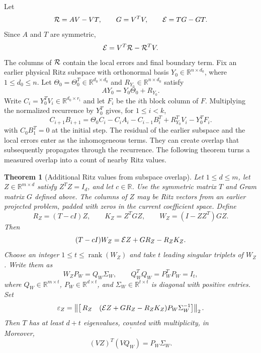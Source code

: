 \documentclass[11pt]{article}
\newtheorem{theorem}{Theorem}
\theoremstyle{definition}
\newcommand{\R}{\mathbb{R}}
\begin{document}
Let
\begin{equation}
 {\cal R}=AV-VT,
 \qquad G=V^TV,
 \qquad {\cal E}=TG-GT.
 \label{eq:ritz-gram-commutator}
\end{equation}
Since $A$ and $T$ are symmetric,
\begin{equation}
 {\cal E}=V^T{\cal R}-{\cal R}^TV.
 \label{eq:ritz-commutator-residual}
\end{equation}
The columns of ${\cal R}$ contain the local errors and final boundary term.
Fix an earlier physical Ritz subspace with orthonormal basis
$Y_0\in\R^{n\times d_0}$, where $1\le d_0\le n$.  Let
$\Theta_0=\Theta_0^T\in\R^{d_0\times d_0}$ and
$R_{Y_0}\in\R^{n\times d_0}$ satisfy
\[
 AY_0=Y_0\Theta_0+R_{Y_0}.
\]
Write $C_i=Y_0^TV_i\in\R^{d_0\times r_i}$ and let $F_i$ be the $i$th
block column of $F$.  Multiplying the normalized recurrence by $Y_0^T$
gives, for $1\le i<k$,
\begin{equation}
 C_{i+1}B_{i+1}
 =\Theta_0 C_i-C_iA_i-C_{i-1}B_i^T
   +R_{Y_0}^TV_i-Y_0^TF_i.
 \label{eq:block-overlap-recurrence}
\end{equation}
with $C_0B_1^T=0$ at the initial step.  The residual of the earlier
subspace and the local errors enter as the inhomogeneous terms.  They can
create overlap that subsequently propagates through the recurrence.
The following theorem turns a measured overlap into a count of nearby
Ritz values.

\begin{theorem}[Additional Ritz values from subspace overlap]
\label{thm:additional-ritz-values}
Let $1\le d\le m$, let $Z\in\R^{m\times d}$ satisfy $Z^TZ=I_d$, and let
$c\in\R$.  Use the symmetric matrix $T$ and Gram matrix $G$ defined above.
The
columns of $Z$ may be Ritz vectors from an earlier projected problem, padded
with zeros in the current coefficient space.  Define
\begin{equation}
 R_Z=(T-cI)Z,
 \qquad K_Z=Z^TGZ,
 \qquad W_Z=(I-ZZ^T)GZ.
 \label{eq:additional-ritz-definitions}
\end{equation}
Then
\begin{equation}
 (T-cI)W_Z={\cal E}Z+GR_Z-R_ZK_Z.
 \label{eq:additional-ritz-identity}
\end{equation}
Choose an integer $1\le t\le\operatorname{rank}(W_Z)$ and take $t$ leading
singular triplets of $W_Z$.  Write them as
\[
 W_ZP_W=Q_W\Sigma_W,
 \qquad Q_W^TQ_W=P_W^TP_W=I_t,
\]
where $Q_W\in\R^{m\times t}$, $P_W\in\R^{d\times t}$, and
$\Sigma_W\in\R^{t\times t}$ is diagonal with positive entries.
Set
\begin{equation}
 \varepsilon_Z=
 \left\|
 \left[\,
 R_Z\quad
 ({\cal E}Z+GR_Z-R_ZK_Z)P_W\Sigma_W^{-1}
 \right]
 \right\|_2.
 \label{eq:additional-ritz-radius}
\end{equation}
Then $T$ has at least $d+t$ eigenvalues, counted with multiplicity, in
\begin{equation}
 [c-\varepsilon_Z,c+\varepsilon_Z].
 \label{eq:additional-ritz-interval}
\end{equation}
Moreover,
\begin{equation}
 (VZ)^T(VQ_W)=P_W\Sigma_W.
 \label{eq:additional-ritz-physical-overlap}
\end{equation}
\end{theorem}
\end{document}
